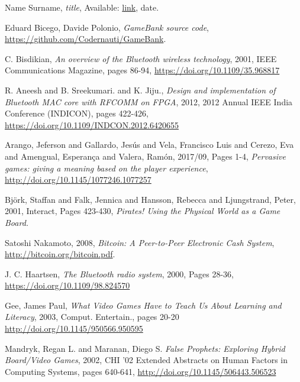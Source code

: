 %
%
%
\begin{thebibliography}{1}

  Name Surname,
  \emph{title},
  Available: \url{link},
  date.
  
  Eduard Bicego, Davide Polonio,
  \emph{GameBank source code},
  \url{https://github.com/Codernauti/GameBank}.
  
  C. Bisdikian,
  \emph{An overview of the Bluetooth wireless technology},
  2001,
  IEEE Communications Magazine, pages 86-94,
  \url{https://doi.org/10.1109/35.968817}

  R. Aneesh and B. Sreekumari. and K. Jiju.,
  \emph{Design and implementation of Bluetooth MAC core with RFCOMM on FPGA},
  2012,
  2012 Annual IEEE India Conference (INDICON), pages 422-426,
  \url{https://doi.org/10.1109/INDCON.2012.6420655}

  Arango, Jeferson and Gallardo, Jesús and Vela, Francisco Luis and Cerezo, Eva 
and Amengual, Esperança and Valera, Ramón,
  2017/09,
  Pages 1-4,
  \emph{Pervasive games: giving a meaning based on the player experience},
  \url{http://doi.org/10.1145/1077246.1077257}
  
  Bj{\"o}rk, Staffan and Falk, Jennica and Hansson, Rebecca and Ljungstrand, 
Peter,
  2001,
  Interact, Pages 423-430,
  \emph{Pirates! Using the Physical World as a Game Board.}
  
  Satoshi Nakamoto,
  2008,
  \emph{Bitcoin: A Peer-to-Peer Electronic Cash System},
  \url{http://bitcoin.org/bitcoin.pdf}.
  
  J. C. Haartsen,
  \emph{The Bluetooth radio system},
  2000,
  Pages 28-36,
  \url{https://doi.org/10.1109/98.824570}

  Gee, James Paul,
  \emph{What Video Games Have to Teach Us About Learning and Literacy},
  2003,
  Comput. Entertain., pages 20-20
  \url{http://doi.org/10.1145/950566.950595}
  
  Mandryk, Regan L. and Maranan, Diego S.
  \emph{False Prophets: Exploring Hybrid Board/Video Games},
  2002,
  CHI '02 Extended Abstracts on Human Factors in Computing Systems, pages 
640-641,
  \url{http://doi.org/10.1145/506443.506523}
  
\end{thebibliography}